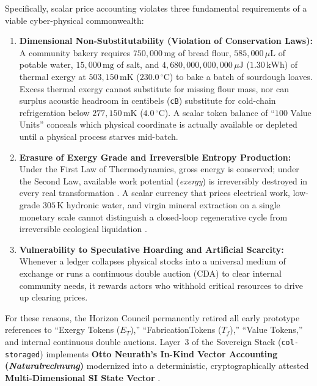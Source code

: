 Specifically, scalar price accounting violates three fundamental requirements of a viable cyber-physical commonwealth:
\begin{enumerate}
    \item \textbf{Dimensional Non-Substitutability (Violation of Conservation Laws):} A community bakery requires $750{,}000\,\mathrm{mg}$ of bread flour, $585{,}000\,\mu\mathrm{L}$ of potable water, $15{,}000\,\mathrm{mg}$ of salt, and $4{,}680{,}000{,}000{,}000\,\mu\mathrm{J}$ ($1.30\,\mathrm{kWh}$) of thermal exergy at $503{,}150\,\mathrm{mK}$ ($230.0\,^\circ\mathrm{C}$) to bake a batch of sourdough loaves. Excess thermal exergy cannot substitute for missing flour mass, nor can surplus acoustic headroom in centibels (\texttt{cB}) substitute for cold-chain refrigeration below $277{,}150\,\mathrm{mK}$ ($4.0\,^\circ\mathrm{C}$). A scalar token balance of ``$100$ Value Units'' conceals which physical coordinate is actually available or depleted until a physical process starves mid-batch.
    \item \textbf{Erasure of Exergy Grade and Irreversible Entropy Production:} Under the First Law of Thermodynamics, gross energy is conserved; under the Second Law, available work potential (\textit{exergy}) is irreversibly destroyed in every real transformation \parencite{kondepudi2014modern,jorgensen2001thermodynamics}. A scalar currency that prices electrical work, low-grade $305\,\mathrm{K}$ hydronic water, and virgin mineral extraction on a single monetary scale cannot distinguish a closed-loop regenerative cycle from irreversible ecological liquidation \parencite{kapp1950social,odum1996environmental}.
    \item \textbf{Vulnerability to Speculative Hoarding and Artificial Scarcity:} Whenever a ledger collapses physical stocks into a universal medium of exchange or runs a continuous double auction (CDA) to clear internal community needs, it rewards actors who withhold critical resources to drive up clearing prices.
\end{enumerate}

For these reasons, the Horizon Council permanently retired all early prototype references to ``Exergy Tokens ($E_T$),'' ``FabricationTokens ($T_f$),'' ``Value Tokens,'' and internal continuous double auctions. Layer~3 of the Sovereign Stack (\texttt{col-storaged}) implements \textbf{Otto Neurath's In-Kind Vector Accounting (\textit{Naturalrechnung})} modernized into a deterministic, cryptographically attested \textbf{Multi-Dimensional SI State Vector} \parencite{neurath1919,bipm2019si}.

